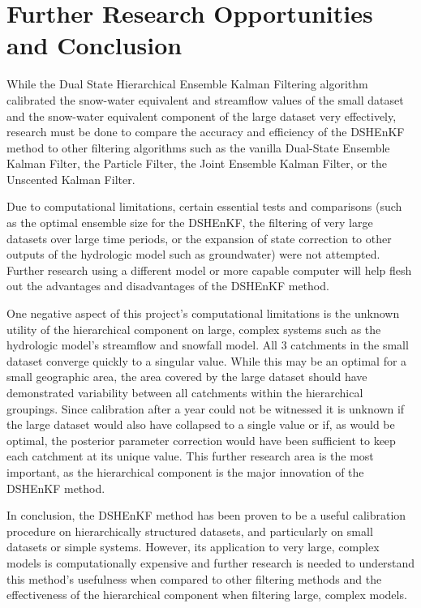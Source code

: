 \chapter{Further Research Opportunities and Conclusion}

While the Dual State Hierarchical Ensemble Kalman Filtering algorithm calibrated the snow-water equivalent and streamflow values of the small dataset and the snow-water equivalent component of the large dataset very effectively, research must be done to compare the accuracy and efficiency of the DSHEnKF method to other filtering algorithms such as the vanilla Dual-State Ensemble Kalman Filter, the Particle Filter, the Joint Ensemble Kalman Filter, or the Unscented Kalman Filter.

Due to computational limitations, certain essential tests and comparisons (such as the optimal ensemble size for the DSHEnKF, the filtering of very large datasets over large time periods, or the expansion of state correction to other outputs of the hydrologic model such as groundwater) were not attempted. Further research using a different model or more capable computer will help flesh out the advantages and disadvantages of the DSHEnKF method.

One negative aspect of this project's computational limitations is the unknown utility of the hierarchical component on large, complex systems such as the hydrologic model's streamflow and snowfall model. All 3 catchments in the small dataset converge quickly to a singular value. While this may be an optimal for a small geographic area, the area covered by the large dataset should have demonstrated variability between all catchments within the hierarchical groupings. Since calibration after a year could not be witnessed it is unknown if the large dataset would also have collapsed to a single value or if, as would be optimal, the posterior parameter correction would have been sufficient to keep each catchment at its unique value. This further research area is the most important, as the hierarchical component is the major innovation of the DSHEnKF method.

In conclusion, the DSHEnKF method has been proven to be a useful calibration procedure on hierarchically structured datasets, and particularly on small datasets or simple systems. However, its application to very large, complex models is computationally expensive and further research is needed to understand this method's usefulness when compared to other filtering methods and the effectiveness of the hierarchical component when filtering large, complex models.